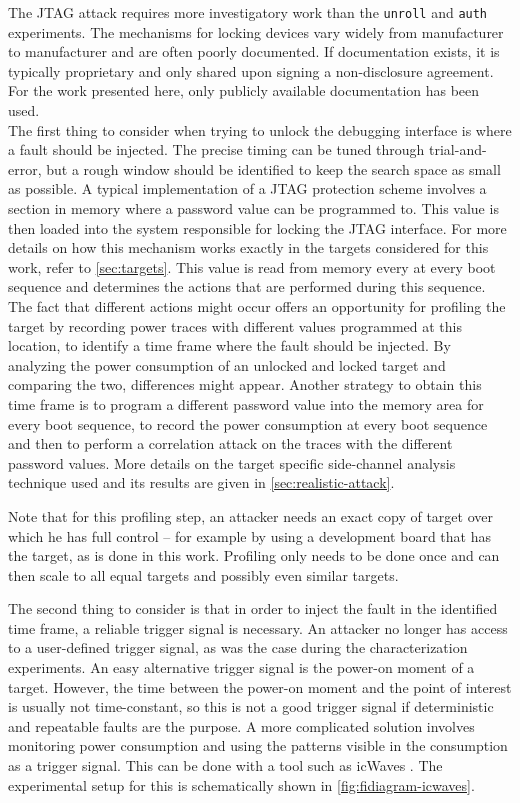 \documentclass[10pt]{article}
\newcommand{\unroll}{\texttt{unroll}\xspace}
\newcommand{\auth}{\texttt{auth}\xspace}
\newcommand{\jtag}{JTAG\xspace}
\begin{document}
      The \jtag attack requires more investigatory work than the \unroll and \auth experiments. The mechanisms for locking devices vary widely from manufacturer to manufacturer and are often poorly documented. If documentation exists, it is typically proprietary and only shared upon signing a non-disclosure agreement. For the work presented here, only publicly available documentation has been used. \\

      \noindent The first thing to consider when trying to unlock the debugging interface is where a fault should be injected. The precise timing can be tuned through trial-and-error, but a rough window should be identified to keep the search space as small as possible. 
      A typical implementation of a JTAG protection scheme involves a section in memory where a password value can be programmed to. This value is then loaded into the system responsible for locking the JTAG interface. For more details on how this mechanism works exactly in the targets considered for this work, refer to \autoref{sec:targets}. 
      This value is read from memory every at every boot sequence and determines the actions that are performed during this sequence. The fact that different actions might occur offers an opportunity for profiling the target by recording power traces with different values programmed at this location, to identify a time frame where the fault should be injected. By analyzing the power consumption of an unlocked and locked target and comparing the two, differences might appear. 
      Another strategy to obtain this time frame is to program a different password value into the memory area for every boot sequence, to record the power consumption at every boot sequence and then to perform a correlation attack on the traces with the different password values. More details on the target specific side-channel analysis technique used and its results are given in \autoref{sec:realistic-attack}. 

      Note that for this profiling step, an attacker needs an exact copy of target over which he has full control --  for example by using a development board that has the target, as is done in this work. Profiling only needs to be done once and can then scale to all equal targets and possibly even similar targets. 

      The second thing to consider is that in order to inject the fault in the identified time frame, a reliable trigger signal is necessary. An attacker no longer has access to a user-defined trigger signal, as was the case during the characterization experiments. An easy alternative trigger signal is the power-on moment of a target. However, the time between the power-on moment and the point of interest is usually not time-constant, so this is not a good trigger signal if deterministic and repeatable faults are the purpose. A more complicated solution involves monitoring power consumption and using the patterns visible in the consumption as a trigger signal. This can be done with a tool such as icWaves \cite{riscure_hardware}. The experimental setup for this is schematically shown in \autoref{fig:fidiagram-icwaves}. 
\end{document}
